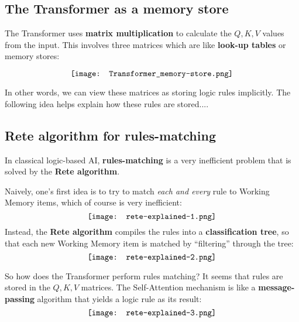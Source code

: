 \subsection{The Transformer as a memory store}

The Transformer uses \textbf{matrix multiplication} to calculate the $Q, K, V$ values from the input.  This involves three matrices which are like \textbf{look-up tables} or memory stores:

\begin{equation}
\vcenter{\hbox{\texttt{[image: Transformer\_memory-store.png]}}}
\end{equation}

In other words, we can view these matrices as storing logic rules implicitly.  The following idea helps explain how these rules are stored....

\subsection{Rete algorithm for rules-matching}

In classical logic-based AI, \textbf{rules-matching} is a very inefficient problem that is solved by the \textbf{Rete algorithm}.

Naively, one's first idea is to try to match \textit{each and every} rule to Working Memory items, which of course is very inefficient:
\begin{equation}
\vcenter{\hbox{\texttt{[image: rete-explained-1.png]}}}
\end{equation}
Instead, the \textbf{Rete algorithm} compiles the rules into a \textbf{classification tree}, so that each new Working Memory item is matched by ``filtering'' through the tree:
\begin{equation}
\vcenter{\hbox{\texttt{[image: rete-explained-2.png]}}}
\end{equation}

So how does the Transformer perform rules matching?  It seems that rules are stored in the $Q, K, V$ matrices.  The Self-Attention mechanism is like a \textbf{message-passing} algorithm that yields a logic rule as its result:
\begin{equation}
\vcenter{\hbox{\texttt{[image: rete-explained-3.png]}}}
\end{equation}


